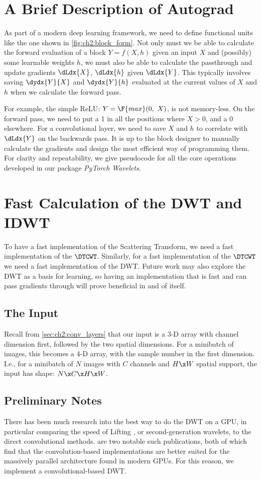 \section{A Brief Description of Autograd}
As part of a modern deep learning framework, we need to define functional units like
the one shown in \autoref{fig:ch2:block_form}. Not only must we be able to
calculate the forward evaluation of a block $Y=f(X,h)$ given an input $X$ and
(possibly) some learnable weights $h$, we must also be able to calculate the
passthrough and update gradients $\dLdx{X}$, $\dLdx{h}$ given $\dLdx{Y}$. This
typically involves saving $\dydx{Y}{X}$ and $\dydx{Y}{h}$ evaluated at the
current values of $X$ and $h$ when we calculate the forward pass.

For example, the simple ReLU: $Y = \F{max}(0,\ X)$, is not memory-less. On the
forward pass, we need to put a 1 in all the positions where $X > 0$, and a 0
elsewhere. For a convolutional layer, we need to save $X$ and $h$ to
correlate with $\dLdx{Y}$ on the backwards pass. It is up to the block designer
to manually calculate the gradients and design the most efficient way of
programming them.  
For clarity and repeatability, we give pseudocode for all the core operations
developed in our package \emph{PyTorch Wavelets}. 

\section{Fast Calculation of the DWT and IDWT}\label{sec:ch3:dwt}
To have a fast implementation of the Scattering Transform, we need a fast
implementation of the $\DTCWT$\@. Similarly, for a fast implementation of the $\DTCWT$ we
need a fast implementation of the DWT\@. Future work may also explore
the DWT as a basis for learning, so having an implementation that is fast and
can pass gradients through will prove beneficial in and of itself. 

\subsection{The Input}
Recall from \autoref{sec:ch2:conv_layers} that our input is a 3-D array with
channel dimension first, followed by the two spatial dimensions. For a minibatch
of images, this becomes a 4-D array, with the sample number in the first
dimension. I.e., for a minibatch of $N$ images with $C$ channels and $H\x W$ spatial support, the
input has shape: $N\x C\x H\x W$.

\subsection{Preliminary Notes}
There has been much research into the best way to do the DWT on a GPU, in
particular comparing the speed of Lifting \cite{sweldens_lifting_1998}, or
second-generation wavelets, to the direct convolutional methods.
\cite{tenllado_parallel_2008, galiano_improving_2011} are two notable such
publications, both of which find that the convolution-based implementations are
better suited for the massively parallel architecture found in modern GPUs. For
this reason, we implement a convolutional-based DWT.

